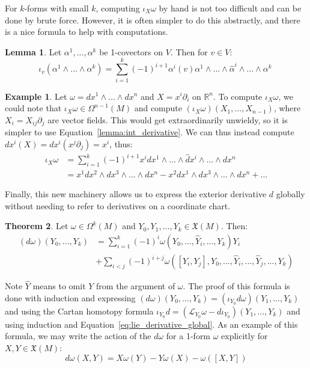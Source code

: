 \documentclass[11pt, oneside]{article}   	%
\theoremstyle{definition}
\newtheorem{theorem}{Theorem}[section]
\newtheorem{example}{Example}[section]
\newtheorem{lemma}[theorem]{Lemma}
\begin{document}
For $k$-forms with small $k$, computing $\iota_X\omega$ by hand is not too difficult and can be done by brute force. 
However, it is often simpler to do this abstractly, and there is a nice formula to help with computations.
\begin{lemma}
	Let $\alpha^1, ..., \alpha^k$ be 1-covectors on $V$. Then for $v\in V$:
	\begin{equation}
		\iota_v(\alpha^1\wedge ...\wedge\alpha^k) = \sum_{i = 1}^k(-1)^{i + 1}\alpha^i(v)\alpha^1\wedge ...\wedge\hat
		\alpha^i\wedge ...\wedge\alpha^k~
		\label{lemma:int_derivative}
	\end{equation}
\end{lemma}

\begin{example}
	Let $\omega = dx^1\wedge ...\wedge dx^n$ and $X = x^i\partial_i$ on $\mathbb R^n$. To compute $\iota_X\omega$, 
	we could note that $\iota_X\omega\in\Omega^{n - 1}(M)$ and compute $(\iota_X\omega)(X_1, ..., X_{n - 1})$, 
	where $X_i = X_{ij}\partial_j$ are vector fields. This would get extraordinarily unwieldy, so it is simpler to use 
	Equation~\ref{lemma:int_derivative}. We can thus instead compute $dx^i(X) = dx^i(x^j\partial_j) = x^i$, thus:
	\begin{align}
		\iota_X\omega &= \sum_{i = 1}^k (-1)^{i + 1} x^i dx^1\wedge ...\wedge\hat dx^i\wedge ...\wedge dx^n \\
		&= x^1 dx^2\wedge dx^3\wedge ...\wedge dx^n - x^2 dx^1\wedge dx^3\wedge ...\wedge dx^n + ...
	\end{align}
\end{example}

Finally, this new machinery allows us to express the exterior derivative 
$d$ globally without needing to refer to derivatives on a coordinate chart.
\begin{theorem}
	Let $\omega\in\Omega^k(M)$ and $Y_0, Y_1, ..., Y_k\in\mathfrak X(M)$. Then:
	\begin{align}
		(d\omega)(Y_0, ..., Y_k) &= \sum_{i = 1}^k(-1)^i \omega(Y_0, ..., \hat Y_i, ..., Y_k)Y_i \\ 
		&+ \sum_{i < j}(-1)^{i + j}
		\omega([Y_i, Y_j], Y_0, ..., \hat Y_i, ..., \hat Y_j, ..., Y_k)
	\end{align}
\end{theorem}
Note $\hat Y$ means to omit $Y$ from the argument of $\omega$. The proof of this formula is done with induction and 
expressing $(d\omega)(Y_0, ..., Y_k) = (\iota_{Y_0} d\omega)(Y_1, ..., Y_k)$ and using the Cartan homotopy formula 
$\iota_{Y_0} d = (\mathcal L_{Y_0}\omega - d\iota_{Y_0})(Y_1, ..., Y_k)$ and using induction and 
Equation~\ref{eq:lie_derivative_global}. As an example of this formula, we may write the action of the $d\omega$ for a 
1-form $\omega$ explicitly for $X, Y\in\mathfrak X(M)$:
\begin{equation}
	d\omega(X, Y) = X\omega(Y) - Y\omega(X) - \omega([X, Y])
\end{equation}
\end{document}
